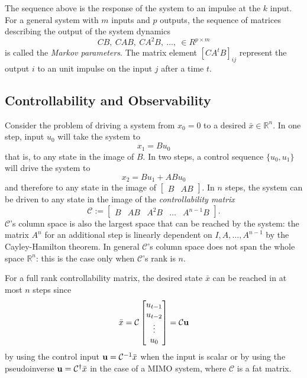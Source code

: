 The sequence above is the response of the system to an impulse at the $k$ input. For a general system with $m$ inputs and $p$ outputs, the sequence of matrices describing the output of the system dynamics
\begin{equation}
  \label{eq:markov-parameters}
  CB,\ CAB,\ CA^2B,\ \ldots,\ \in R^{p\times m}
\end{equation}
is called the \emph{Markov parameters}. The matrix element $\left[CA^tB\right]_{ij}$ represent the output $i$ to an unit impulse on the input $j$ after a time $t$.

\subsection{Controllability and Observability}
\label{sec:controllability-observability}

Consider the problem of driving a system from $x_0=0$ to a desired $\bar{x}\in \mathbb{R}^n$. In one step, input $u_0$ will take the system to
\begin{equation*}
  x_1 = Bu_0
\end{equation*}
that is, to any state in the image of $B$. In two steps, a control sequence $\{u_0,u_1\}$ will drive the system to
\begin{equation*}
  x_2 = Bu_1 + ABu_0
\end{equation*}
and therefore to any state in the image of $\begin{bmatrix}B & AB\end{bmatrix}$. In $n$ steps, the system can be driven to any state in the image of the \emph{controllability matrix}
\begin{equation}
  \label{eq:controllability-matrix}
  \mathcal{C} :=
  \begin{bmatrix}
    B & AB & A^2B & \ldots & A^{n-1}B
  \end{bmatrix}.
\end{equation}
$\mathcal{C}$'s column space is also the largest space that can be reached by the system: the matrix $A^n$ for an additional step is linearly dependent on $I,A,\ldots, A^{n-1}$ by the Cayley-Hamilton theorem. In general $\mathcal{C}$'s column space does not span the whole space $\mathbb{R}^n$: this is the case only when $\mathcal{C}$'s rank is $n$.

For a full rank controllability matrix, the desired state $\bar{x}$ can be reached in at most $n$ steps since
\begin{equation*}
  \bar{x} = \mathcal{C}
  \begin{bmatrix}
    u_{t-1} \\ u_{t-2} \\ \vdots \\ u_0
  \end{bmatrix} = \mathcal{C} \boldsymbol{\mathrm{u}}
\end{equation*}
by using the control input $\boldsymbol{\mathrm{u}} = \mathcal{C}^{-1}\bar{x}$ when the input is scalar or by using the pseudoinverse $\boldsymbol{\mathrm{u}} = \mathcal{C}^\dagger\bar{x}$ in the case of a MIMO system, where $\mathcal{C}$ is a fat matrix.

